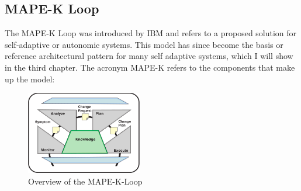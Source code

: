     \subsection{MAPE-K Loop}
    \label{sub:mape}
    The MAPE-K Loop was introduced by IBM \cite{Kephart:2003:VAC:642194.642200} and refers to a proposed solution for self-adaptive or autonomic systems.
    This model has since become the basis or reference architectural pattern for many self adaptive systems, which I will show in the third chapter.
    The acronym MAPE-K refers to the components that make up the model:
    \begin{figure}[hbt]
        \label{fig:mape}
        \centering
        \includegraphics[width=0.45\textwidth]{Bilder/mape.png}
        \caption{
                Overview of the MAPE-K-Loop\cite{Kephart:2003:VAC:642194.642200}
                }
    \end{figure}  
